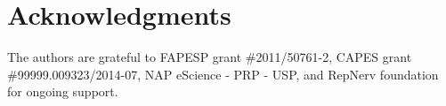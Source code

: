 \section{Acknowledgments}
The authors are grateful to FAPESP grant \#2011/50761-2, CAPES grant \#99999.009323/2014-07, NAP eScience - PRP - USP, and RepNerv foundation for ongoing support.

